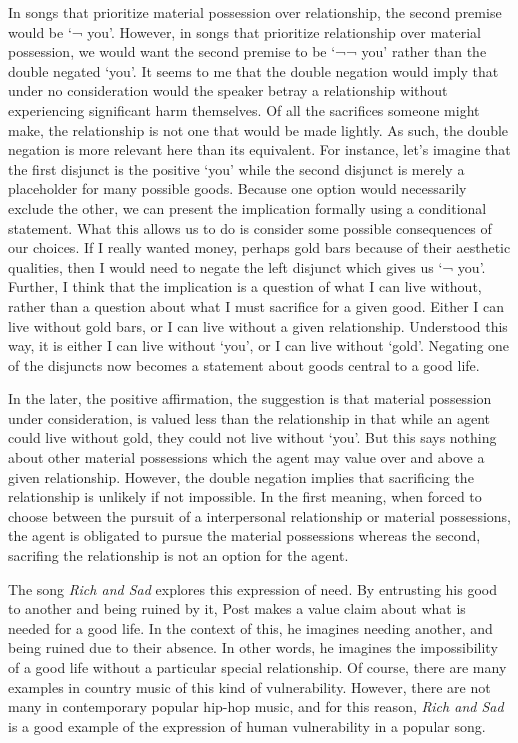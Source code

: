 \documentclass[
  letterpaper,
  DIV=11,
  numbers=noendperiod]{scrartcl}
\theoremstyle{remark}
\begin{document}
In songs that prioritize material possession over relationship, the
second premise would be `¬ you'. However, in songs that prioritize
relationship over material possession, we would want the second premise
to be `¬¬ you' rather than the double negated `you'. It seems to me that
the double negation would imply that under no consideration would the
speaker betray a relationship without experiencing significant harm
themselves. Of all the sacrifices someone might make, the relationship
is not one that would be made lightly. As such, the double negation is
more relevant here than its equivalent. For instance, let's imagine that
the first disjunct is the positive `you' while the second disjunct is
merely a placeholder for many possible goods. Because one option would
necessarily exclude the other, we can present the implication formally
using a conditional statement. What this allows us to do is consider
some possible consequences of our choices. If I really wanted money,
perhaps gold bars because of their aesthetic qualities, then I would
need to negate the left disjunct which gives us `¬ you'. Further, I
think that the implication is a question of what I can live without,
rather than a question about what I must sacrifice for a given good.
Either I can live without gold bars, or I can live without a given
relationship. Understood this way, it is either I can live without
`you', or I can live without `gold'. Negating one of the disjuncts now
becomes a statement about goods central to a good life.

In the later, the positive affirmation, the suggestion is that material
possession under consideration, is valued less than the relationship in
that while an agent could live without gold, they could not live without
`you'. But this says nothing about other material possessions which the
agent may value over and above a given relationship. However, the double
negation implies that sacrificing the relationship is unlikely if not
impossible. In the first meaning, when forced to choose between the
pursuit of a interpersonal relationship or material possessions, the
agent is obligated to pursue the material possessions whereas the
second, sacrifing the relationship is not an option for the agent.

The song \emph{Rich and Sad} explores this expression of need. By
entrusting his good to another and being ruined by it, Post makes a
value claim about what is needed for a good life. In the context of
this, he imagines needing another, and being ruined due to their
absence. In other words, he imagines the impossibility of a good life
without a particular special relationship. Of course, there are many
examples in country music of this kind of vulnerability. However, there
are not many in contemporary popular hip-hop music, and for this reason,
\emph{Rich and Sad} is a good example of the expression of human
vulnerability in a popular song.
\end{document}
